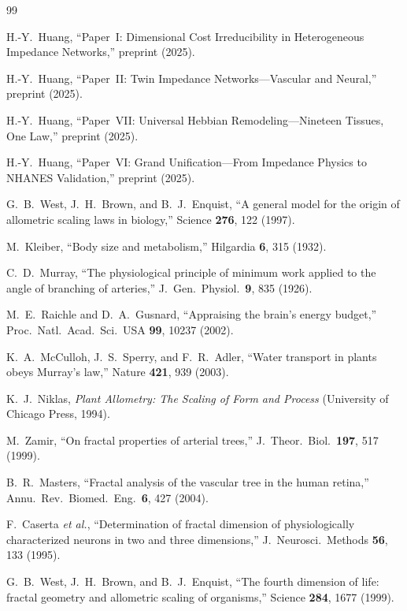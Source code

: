 \documentclass[aps,pre,twocolumn,superscriptaddress,longbibliography]{revtex4-2}
\begin{document}
\begin{thebibliography}{99}

H.-Y.~Huang,
``Paper~I: Dimensional Cost Irreducibility in Heterogeneous
Impedance Networks,''
preprint (2025).

H.-Y.~Huang,
``Paper~II: Twin Impedance Networks---Vascular and Neural,''
preprint (2025).

H.-Y.~Huang,
``Paper~VII: Universal Hebbian Remodeling---Nineteen Tissues,
One Law,''
preprint (2025).

H.-Y.~Huang,
``Paper~VI: Grand Unification---From Impedance Physics to
NHANES Validation,''
preprint (2025).

G.~B.~West, J.~H.~Brown, and B.~J.~Enquist,
``A general model for the origin of allometric scaling laws
in biology,''
Science \textbf{276}, 122 (1997).

M.~Kleiber,
``Body size and metabolism,''
Hilgardia \textbf{6}, 315 (1932).

C.~D.~Murray,
``The physiological principle of minimum work applied to the
angle of branching of arteries,''
J.~Gen.\ Physiol.\ \textbf{9}, 835 (1926).

M.~E.~Raichle and D.~A.~Gusnard,
``Appraising the brain's energy budget,''
Proc.\ Natl.\ Acad.\ Sci.\ USA \textbf{99}, 10237 (2002).

K.~A.~McCulloh, J.~S.~Sperry, and F.~R.~Adler,
``Water transport in plants obeys Murray's law,''
Nature \textbf{421}, 939 (2003).

K.~J.~Niklas,
\emph{Plant Allometry: The Scaling of Form and Process}
(University of Chicago Press, 1994).

M.~Zamir,
``On fractal properties of arterial trees,''
J.~Theor.\ Biol.\ \textbf{197}, 517 (1999).

B.~R.~Masters,
``Fractal analysis of the vascular tree in the human retina,''
Annu.\ Rev.\ Biomed.\ Eng.\ \textbf{6}, 427 (2004).

F.~Caserta \textit{et al.},
``Determination of fractal dimension of physiologically
characterized neurons in two and three dimensions,''
J.~Neurosci.\ Methods \textbf{56}, 133 (1995).

G.~B.~West, J.~H.~Brown, and B.~J.~Enquist,
``The fourth dimension of life: fractal geometry and allometric
scaling of organisms,''
Science \textbf{284}, 1677 (1999).

\end{thebibliography}
\end{document}
